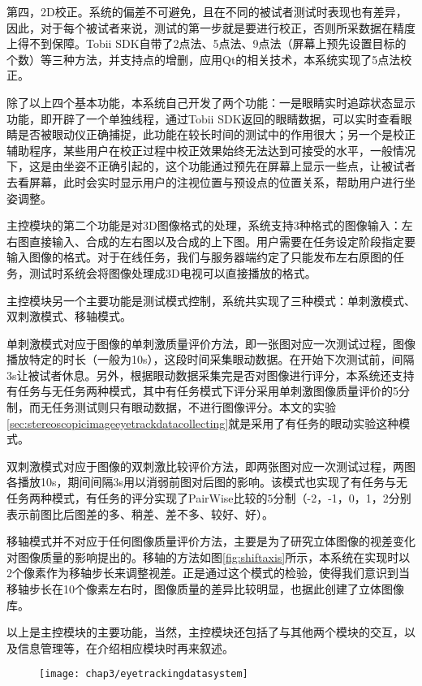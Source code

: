 第四，2D校正。系统的偏差不可避免，且在不同的被试者测试时表现也有差异，因此，对于每个被试者来说，测试的第一步就是要进行校正，否则所采数据在精度上得不到保障。Tobii SDK自带了2点法、5点法、9点法（屏幕上预先设置目标的个数）等三种方法，并支持点的增删，应用Qt的相关技术，本系统实现了5点法校正。

除了以上四个基本功能，本系统自己开发了两个功能：一是眼睛实时追踪状态显示功能，即开辟了一个单独线程，通过Tobii SDK返回的眼睛数据，可以实时查看眼睛是否被眼动仪正确捕捉，此功能在较长时间的测试中的作用很大；另一个是校正辅助程序，某些用户在校正过程中校正效果始终无法达到可接受的水平，一般情况下，这是由坐姿不正确引起的，这个功能通过预先在屏幕上显示一些点，让被试者去看屏幕，此时会实时显示用户的注视位置与预设点的位置关系，帮助用户进行坐姿调整。

主控模块的第二个功能是对3D图像格式的处理，系统支持3种格式的图像输入：左右图直接输入、合成的左右图以及合成的上下图。用户需要在任务设定阶段指定要输入图像的格式。对于在线任务，我们与服务器端约定了只能发布左右原图的任务，测试时系统会将图像处理成3D电视可以直接播放的格式。

主控模块另一个主要功能是测试模式控制，系统共实现了三种模式：单刺激模式、双刺激模式、移轴模式。

单刺激模式对应于图像的单刺激质量评价方法，即一张图对应一次测试过程，图像播放特定的时长（一般为10s），这段时间采集眼动数据。在开始下次测试前，间隔3s让被试者休息。另外，根据眼动数据采集完是否对图像进行评分，本系统还支持有任务与无任务两种模式，其中有任务模式下评分采用单刺激图像质量评价的5分制，而无任务测试则只有眼动数据，不进行图像评分。本文的实验\ref{sec:stereoscopicimageeyetrackdatacollecting}就是采用了有任务的眼动实验这种模式。

双刺激模式对应于图像的双刺激比较评价方法，即两张图对应一次测试过程，两图各播放10s，期间间隔3s用以消弱前图对后图的影响。该模式也实现了有任务与无任务两种模式，有任务的评分实现了PairWise比较的5分制（-2，-1，0，1，2分别表示前图比后图差的多、稍差、差不多、较好、好）。

移轴模式并不对应于任何图像质量评价方法，主要是为了研究立体图像的视差变化对图像质量的影响提出的。移轴的方法如图\ref{fig:shiftaxis}所示，本系统在实现时以2个像素作为移轴步长来调整视差。正是通过这个模式的检验，使得我们意识到当移轴步长在10个像素左右时，图像质量的差异比较明显，也据此创建了立体图像库。

以上是主控模块的主要功能，当然，主控模块还包括了与其他两个模块的交互，以及信息管理等，在介绍相应模块时再来叙述。
\begin{figure}[t]
  \centering
  \texttt{[image: chap3/eyetrackingdatasystem]}
\end{figure}
